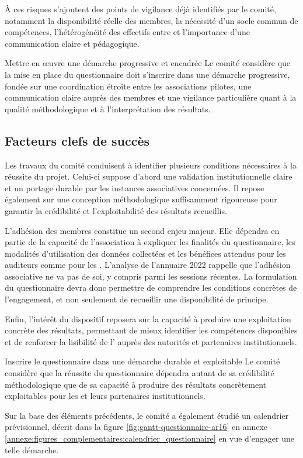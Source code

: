 À ces risques s'ajoutent des points de vigilance déjà identifiés par le comité, notamment la disponibilité réelle des membres, la nécessité d'un socle commun de compétences, l'hétérogénéité des effectifs entre \AssociationsRegionalesIHEDN{} et l'importance d'une communication claire et pédagogique.

\begin{subproposition}{Mettre en œuvre une démarche progressive et encadrée}
Le comité considère que la mise en place du questionnaire doit s'inscrire dans une démarche progressive, fondée sur une coordination étroite entre les associations pilotes, une communication claire auprès des membres et une vigilance particulière quant à la qualité méthodologique et à l'interprétation des résultats.
\end{subproposition}

\clearpage

\subsection{Facteurs clefs de succès}

Les travaux du comité conduisent à identifier plusieurs conditions nécessaires à la réussite du projet. Celui-ci suppose d'abord une validation institutionnelle claire et un portage durable par les instances associatives concernées. Il repose également sur une conception méthodologique suffisamment rigoureuse pour garantir la crédibilité et l'exploitabilité des résultats recueillis.

L'adhésion des membres constitue un second enjeu majeur. Elle dépendra en partie de la capacité de l'association à expliquer les finalités du questionnaire, les modalités d'utilisation des données collectées et les bénéfices attendus pour les auditeurs comme pour les \AssociationsUnionIHEDN. L'analyse de l'annuaire 2022 rappelle que l'adhésion associative ne va pas de soi, y compris parmi les sessions récentes. La formulation du questionnaire devra donc permettre de comprendre les conditions concrètes de l'engagement, et non seulement de recueillir une disponibilité de principe.

Enfin, l'intérêt du dispositif reposera sur la capacité à produire une exploitation concrète des résultats, permettant de mieux identifier les compétences disponibles et de renforcer la lisibilité de l'\ARSeize{} auprès des autorités et partenaires institutionnels.

\begin{subproposition}{Inscrire le questionnaire dans une démarche durable et exploitable}
Le comité considère que la réussite du questionnaire dépendra autant de sa crédibilité méthodologique que de sa capacité à produire des résultats concrètement exploitables pour les \AssociationsUnionIHEDN{} et leurs partenaires institutionnels.
\end{subproposition}

Sur la base des éléments précédents, le comité a également étudié un calendrier prévisionnel, décrit dans la figure \ref{fig:gantt-questionnaire-ar16} en annexe \ref{annexe:figures_complementaires:calendrier_questionnaire} en vue d'engager une telle démarche.
